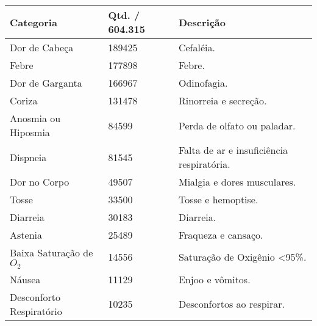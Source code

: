 \begin{table}[H]
  \centering

  \begin{tabular}{lll}
    \hline
    \multicolumn{1}{|l|}{\textbf{Categoria}} & \multicolumn{1}{l|}{\textbf{Qtd. / 604.315}} & \multicolumn{1}{l|}{\textbf{Descrição}}   \\ \hline
    Dor de Cabeça                            & 189425                                       & Cefaléia.                                 \\
    Febre                                    & 177898                                       & Febre.                                    \\
    Dor de Garganta                          & 166967                                       & Odinofagia.                               \\
    Coriza                                   & 131478                                       & Rinorreia e secreção.                     \\
    Anosmia ou Hiposmia                      & 84599                                        & Perda de olfato ou paladar.               \\
    Dispneia                                 & 81545                                        & Falta de ar e insuficiência respiratória. \\
    Dor no Corpo                             & 49507                                        & Mialgia e dores musculares.               \\
    Tosse                                    & 33500                                        & Tosse e hemoptise.                        \\
    Diarreia                                 & 30183                                        & Diarreia.                                 \\
    Astenia                                  & 25489                                        & Fraqueza e cansaço.                       \\
    Baixa Saturação de $O_2$                    & 14556                                        & Saturação de Oxigênio \textless 95\%.     \\
    Náusea                                   & 11129                                        & Enjoo e vômitos.                          \\
    Desconforto Respiratório                 & 10235                                        & Desconfortos ao respirar.                 \\

\end{tabular}
\end{table}
